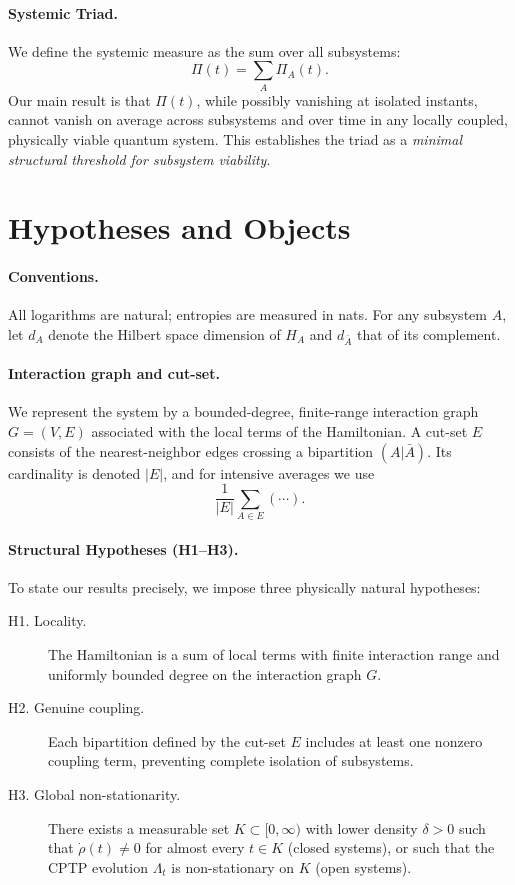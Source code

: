 \documentclass[10pt]{article}
\begin{document}
\paragraph{Systemic Triad.}
We define the systemic measure as the sum over all subsystems:
\begin{equation}
\Pi(t) = \sum_{A} \Pi_A(t).
\end{equation}
Our main result is that $\Pi(t)$, while possibly vanishing at isolated instants, cannot vanish on average
across subsystems and over time in any locally coupled, physically viable quantum system. This
establishes the triad as a \emph{minimal structural threshold for subsystem viability}.
\section{Hypotheses and Objects}

\paragraph{Conventions.}
All logarithms are natural; entropies are measured in nats. For any subsystem $A$, let $d_A$ denote the
Hilbert space dimension of $H_A$ and $d_{\bar{A}}$ that of its complement.

\paragraph{Interaction graph and cut-set.}
We represent the system by a bounded-degree, finite-range interaction graph $G=(V,E)$ associated
with the local terms of the Hamiltonian. A cut-set $E$ consists of the nearest-neighbor edges crossing
a bipartition $(A|\bar{A})$. Its cardinality is denoted $|E|$, and for intensive averages we use
\begin{equation}
\frac{1}{|E|} \sum_{A \in E} (\cdots).
\end{equation}
\paragraph{Structural Hypotheses (H1–H3).}
To state our results precisely, we impose three physically natural hypotheses:
\begin{description}
    \item[H1. Locality.] The Hamiltonian is a sum of local terms with finite interaction range and uniformly bounded degree on the interaction graph $G$.
    \item[H2. Genuine coupling.] Each bipartition defined by the cut-set $E$ includes at least one nonzero coupling term, preventing complete isolation of subsystems.
    \item[H3. Global non-stationarity.] There exists a measurable set $K \subset [0,\infty)$ with lower density $\delta > 0$ such that $\dot\rho(t) \neq 0$ for almost every $t \in K$ (closed systems), or such that the CPTP evolution $\Lambda_t$ is non-stationary on $K$ (open systems).
\end{description}
\end{document}
